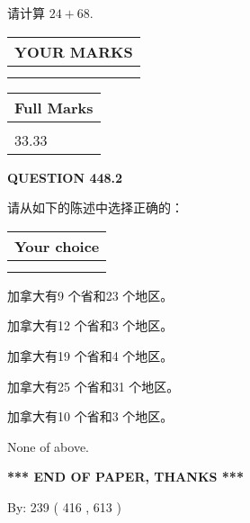 \documentclass{ctexart}
\begin{document}
  
 
请计算 $ %
24 +  %
68 $.
 

 

 
  
\vspace{0.2in}
  
\noindent\begin{tabular}{|l|}
\hline
 YOUR MARKS  \\
\hline
 \\ 
 \\ 
\hline
\end{tabular}
\hspace{0.05in} \begin{tabular}{|l|}
\hline
 Full Marks  \\
\hline
 \\ 
33.33 \\
\hline
\end{tabular}
{\textbf{\Large{QUESTION
448.2 
}}}
  
  
请从如下的陈述中选择正确的：
  
  
\noindent\hspace{3.0in} \begin{tabular}{|l|}
\hline
Your choice \\
\hline
 \\ 
 \\ 
\hline
\end{tabular}
  
  
 
 
加拿大有9 个省和23 个地区。
 
 
加拿大有12 个省和3 个地区。
 
 
加拿大有19 个省和4 个地区。
 
 
加拿大有25 个省和31 个地区。
 
 
加拿大有10 个省和3 个地区。
 
 
 None of above.
 
 
   
   
 \vspace{0.2in}
 
   
   
   
   
\vspace{1.0in} 
{\textbf{\large{ *** END OF PAPER, THANKS *** }}} 
   
   
\hspace{1.0in} By: 
 239 ( 416 ,  613 )
   
\end{document}
